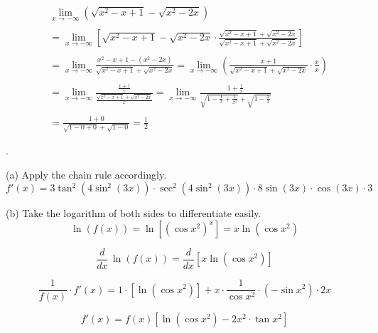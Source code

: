 \documentclass{article}
\begin{document}
\begin{align*}&\lim_{x\to -\infty}\left(\sqrt{x^2-x+1}-\sqrt{x^2-2x}\right)\\\\&=\lim_{x\to -\infty}\left[\sqrt{x^2-x+1}-\sqrt{x^2-2x}\cdot\frac{\sqrt{x^2-x+1}+\sqrt{x^2-2x}}{\sqrt{x^2-x+1}+\sqrt{x^2-2x}}\right]\\\\&=\lim_{x\to-\infty}\frac{x^2-x+1-\left(x^2-2x\right)}{\sqrt{x^2-x+1}+\sqrt{x^2-2x}}=\lim_{x\to-\infty}\left(\frac{x+1}{\sqrt{x^2-x+1}+\sqrt{x^2-2x}}\cdot\frac{x}{x}\right)\\\\&=\lim_{x\to-\infty}\frac{\displaystyle\frac{x+1}x}{\displaystyle \frac{\sqrt{x^2-x+1}+\sqrt{x^2-2x}}x}=\lim_{x\to-\infty}\frac{\displaystyle1+\frac{1}x}{\displaystyle\sqrt{1-\frac1x+\frac1{x^2}}+\sqrt{1-\frac2x}}\\\\&=\frac{1+0}{\sqrt{1-0+0}+\sqrt{1-0}}=\boxed{\frac12}\end{align*}

\newpage

.

\hfill

\noindent (a) Apply the chain rule accordingly.
\begin{equation*}
\boxed{f'(x) = 3\tan^2\left(4\sin^2(3x)\right)\cdot \sec^2\left(4\sin^2(3x)\right)\cdot8\sin(3x)\cdot \cos(3x)\cdot 3}
\end{equation*}

\hfill

\noindent (b) Take the logarithm of both sides to differentiate easily.
\begin{equation*}\ln\left(f(x)\right)=\ln\left[\left(\cos x^2\right)^x\right]=x\ln\left(\cos x^2\right)\end{equation*}

\begin{equation*}\frac{d}{dx}\,\ln\left(f(x)\right)=\frac{d}{dx}\left[x\ln\left(\cos x^2\right)\right]\end{equation*}

\begin{equation*}\frac1{f(x)}\cdot f'(x)=1\cdot\left[\ln\left(\cos x^2\right)\right] + x\cdot\frac1{\cos x^2}\cdot\left(-\sin x^2\right)\cdot 2x\end{equation*}

\begin{equation*}f'(x)=f(x)\left[\ln\left(\cos x^2\right)-2x^2\cdot\tan x^2\right]\end{equation*}
\end{document}
